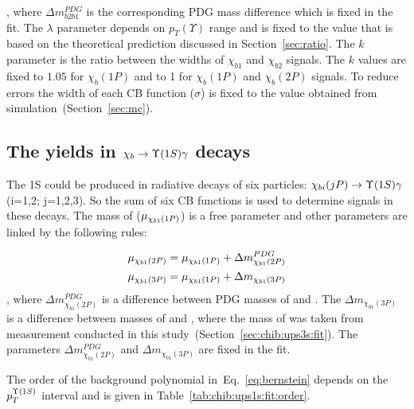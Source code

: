 , where $\Delta m_{b2b1}^{PDG}$ is the corresponding PDG mass difference which
is fixed in the fit. The $\lambda$ parameter depends on $p_T(\Upsilon)$ range
and is fixed to the value that is based on the theoretical prediction discussed
in Section~\ref{sec:ratio}. The $k$ parameter is the ratio between the widths of
$\chi_{b1}$ and $\chi_{b2}$ signals. The $k$ values are fixed to $1.05$ for
$\chi_b(1P)$  and to 1 for $\chi_b(1P)$ and $\chi_b(2P)$ signals. To reduce
errors the width of each CB function ($\sigma$) is fixed to the value obtained
from simulation~(Section~\ref{sec:mc}).

\subsection{The \texorpdfstring{\chib}{xb} yields in
	\texorpdfstring{$\chib \to \Y1S \gamma$}{chib -> Y(1S) gamma} decays}
\label{sec:chib:ups1s:fit}

The \Y1S could be produced in radiative decays of six \chib particles:
$\chi_{bi}(jP) \to \Y1S \gamma$ (i=1,2; j=1,2,3). So the sum of six CB functions
is used to determine \chib signals in these decays. The mass of \chiboneOneP
($\mu_{\chi_{b 1}(1P)}$) is a free parameter and  other parameters are linked by
the following rules:

\begin{equation}
  \begin{aligned}
\mu_{\chi_{b 1}(2P)} = \mu_{\chi_{b 1}(1P)} + \Delta m_{\chi_{b1}(2P)}^{PDG} \\
\mu_{\chi_{b 1}(3P)} = \mu_{\chi_{b 1}(1P)} + \Delta m_{\chi_{b1}(3P)} \\
  \end{aligned}
\end{equation}
, where $\Delta m_{\chi_{b1}(2P)}^{PDG}$ is a difference between PDG masses of
\chiboneTwoP and \chiboneOneP. The $\Delta  m_{\chi_{b1}(3P)}$ is a difference
between masses of \chiboneThreeP and \chiboneOneP, where the mass of
\chiboneThreeP was taken from measurement conducted in this
study~(Section~\ref{sec:chib:ups3s:fit}). The parameters  $\Delta
m_{\chi_{b1}(2P)}^{PDG}$ and $\Delta  m_{\chi_{b1}(3P)}$ are fixed in the fit.

The order of the background polynomial in~Eq.~\ref{eq:bernstein} depends on the
$p_{T}^{\OneS}$ interval and is given in Table~\ref{tab:chib:ups1s:fit:order}.



